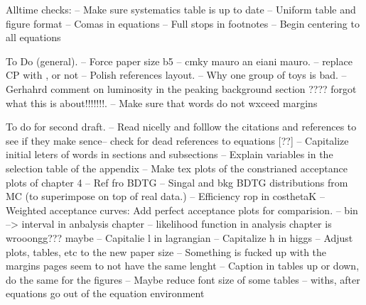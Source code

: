 Alltime checks:
-- Make sure systematics table is up to date
-- Uniform table and figure format
-- Comas in equations
-- Full stops in footnotes
-- Begin centering to all equations

To Do (general).
-- Force paper size b5
-- cmky mauro an eiani mauro.
-- replace CP with \CP, or not
-- Polish references layout.
-- Why one group of toys is bad.
-- Gerhahrd comment on luminosity in the peaking background section ???? forgot what this is about!!!!!!!.
-- Make sure that words do not wxceed margins

To do for second draft.
-- Read nicelly and folllow the citations and references to see if they make sence-- check for dead references to equations [??]
-- Capitalize initial leters of words in sections and subsections
-- Explain variables in the selection table of the appendix
-- Make tex plots of the constrianed acceptance plots of chapter 4
-- Ref fro BDTG
-- Singal and bkg BDTG distributions from MC (to superimpose on top of real data.)
-- Efficiency rop in costhetaK
-- Weighted acceptance curves: Add perfect acceptance plots for comparision.
-- bin --> interval in anbalysis chapter
-- likelihood function in analysis chapter is wrooongg??? maybe
-- Capitalie l in lagrangian
-- Capitalize h in higgs
-- Adjust plots, tables, etc to the new paper size
-- Something is fucked up with the margins pages seem to not have the same lenght
-- Caption in tables up or down, do the same for the figures
-- Maybe reduce font size of some tables
-- withs, after equations go out of the equation environment
